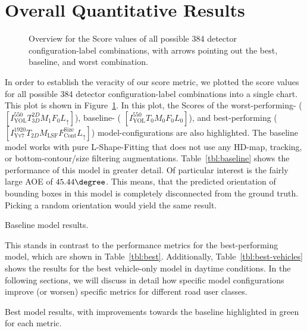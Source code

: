 
\section{Overall Quantitative Results}
\label{sec:baseline}

\begin{figure}[htb]
    
    \caption{Overview for the Score values of all possible 384 detector configuration-label combinations, with arrows pointing out the best, baseline, and worst combination.}
    \label{fig:all-scores}
\end{figure}

In order to establish the veracity of our score metric, we plotted the score values for all possible 384 detector configuration-label combinations into a single chart.
This plot is shown in Figure~\ref{fig:all-scores}.
In this plot, the Scores of the worst-performing- ($\left[I^{550}_\text{YOL}T^{2D}_{3D}M_1F_0L_{\uparrow}\right]$), baseline- ( $\left[I^{550}_\text{YOL}T_0M_0F_0L_0\right]$), and best-performing ($\left[I^{1920}_\text{Yv7}T_{2D}M_\text{LSF}F_\text{Cont}^\text{Size}L_{\uparrow}\right]$) model-configurations are also highlighted.
The baseline model works with pure L-Shape-Fitting that does not use any HD-map, tracking, or bottom-contour/size filtering augmentations.
Table~\ref{tbl:baseline} shows the performance of this model in greater detail.
Of particular interest is the fairly large AOE of $45.44\degree$.
This means, that the predicted orientation of bounding boxes in this model is  completely disconnected from the ground truth.
Picking a random orientation would yield the same result.

\begin{table}[htbp]
    
    \caption{Baseline model results.}
    \label{tbl:baseline}
\end{table}

This stands in contrast to the performance metrics for the best-performing model, which are shown in Table~\ref{tbl:best}.
Additionally, Table~\ref{tbl:best-vehicles} shows the results for the best vehicle-only model in daytime conditions.
In the following sections, we will discuss in detail how specific model configurations improve (or worsen) specific metrics for different road user classes.

\begin{table}[htbp]
    
    \caption{Best model results, with improvements towards the baseline highlighted in green for each metric.}
    \label{tbl:best}
\end{table}

